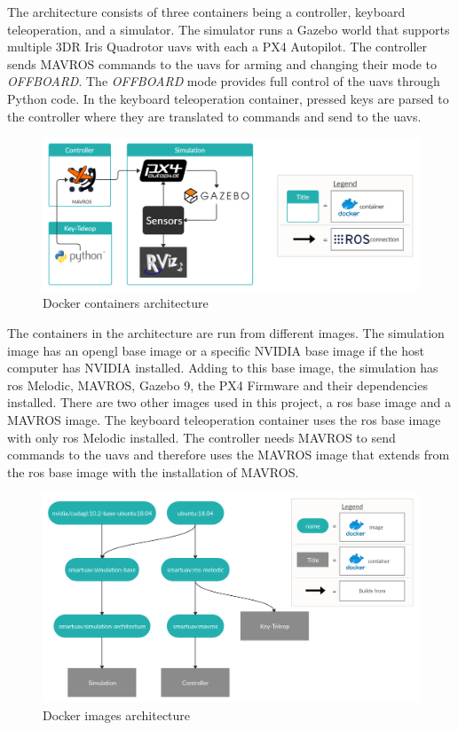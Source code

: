 The architecture consists of three containers being a controller, keyboard teleoperation, and a simulator. The simulator runs a Gazebo world that supports multiple 3DR Iris Quadrotor \acsp{uav} with each a PX4 Autopilot. The controller sends MAVROS commands to the \acsp{uav} for arming and changing their mode to \textit{OFFBOARD}. The \textit{OFFBOARD} mode provides full control of the \acsp{uav} through Python code. In the keyboard teleoperation container, pressed keys are parsed to the controller where they are translated to commands and send to the \acsp{uav}.

\begin{figure}[!h]
  \centering
  \includegraphics[width=
  \linewidth]{images/architecture_containers.png}
  \caption{Docker containers architecture}
\end{figure}

\clearpage

The containers in the architecture are run from different images. The simulation image has an \acs{opengl} base image or a specific NVIDIA base image if the host computer has NVIDIA installed. Adding to this base image, the simulation has \acs{ros} Melodic, MAVROS, Gazebo 9, the PX4 Firmware and their dependencies installed. There are two other images used in this project, a \acs{ros} base image and a MAVROS image. The keyboard teleoperation container uses the \acs{ros} base image with only \acs{ros} Melodic installed. The controller needs MAVROS to send commands to the \acsp{uav} and therefore uses the MAVROS image that extends from the \acs{ros} base image with the installation of MAVROS.

\begin{figure}[!h]
  \centering
  \includegraphics[width=\linewidth]{images/architecture_images.png}
  \caption{Docker images architecture}
\end{figure}

